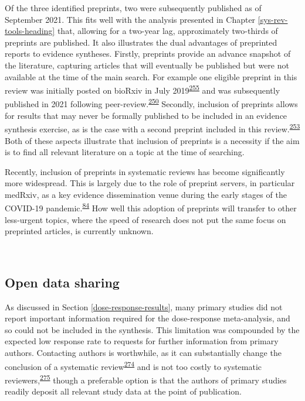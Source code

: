 \documentclass[a4paper, twoside]{templates/ociamthesis}
\begin{document}
Of the three identified preprints, two were subsequently published as of September 2021. This fits well with the analysis presented in Chapter \ref{sys-rev-tools-heading} that, allowing for a two-year lag, approximately two-thirds of preprints are published. It also illustrates the dual advantages of preprinted reports to evidence syntheses. Firstly, preprints provide an advance snapshot of the literature, capturing articles that will eventually be published but were not available at the time of the main search. For example one eligible preprint in this review was initially posted on bioRxiv in July 2019\textsuperscript{\protect\hyperlink{ref-andrews2019}{255}} and was subsequently published in 2021 following peer-review.\textsuperscript{\protect\hyperlink{ref-andrews2021}{250}} Secondly, inclusion of preprints allows for results that may never be formally published to be included in an evidence synthesis exercise, as is the case with a second preprint included in this review.\textsuperscript{\protect\hyperlink{ref-so2017}{253}} Both of these aspects illustrate that inclusion of preprints is a necessity if the aim is to find all relevant literature on a topic at the time of searching.

Recently, inclusion of preprints in systematic reviews has become significantly more widespread. This is largely due to the role of preprint servers, in particular medRxiv, as a key evidence dissemination venue during the early stages of the COVID-19 pandemic.\textsuperscript{\protect\hyperlink{ref-fraser2020preprinting}{84}} How well this adoption of preprints will transfer to other less-urgent topics, where the speed of research does not put the same focus on preprinted articles, is currently unknown.

~

\hypertarget{sys-rev-open-data}{%
\subsection{Open data sharing}\label{sys-rev-open-data}}

As discussed in Section \ref{dose-response-results}, many primary studies did not report important information required for the dose-response meta-analysis, and so could not be included in the synthesis. This limitation was compounded by the expected low response rate to requests for further information from primary authors. Contacting authors is worthwhile, as it can substantially change the conclusion of a systematic review\textsuperscript{\protect\hyperlink{ref-meursingereynders2019}{274}} and is not too costly to systematic reviewers,\textsuperscript{\protect\hyperlink{ref-cooper2019}{275}} though a preferable option is that the authors of primary studies readily deposit all relevant study data at the point of publication.
\end{document}

